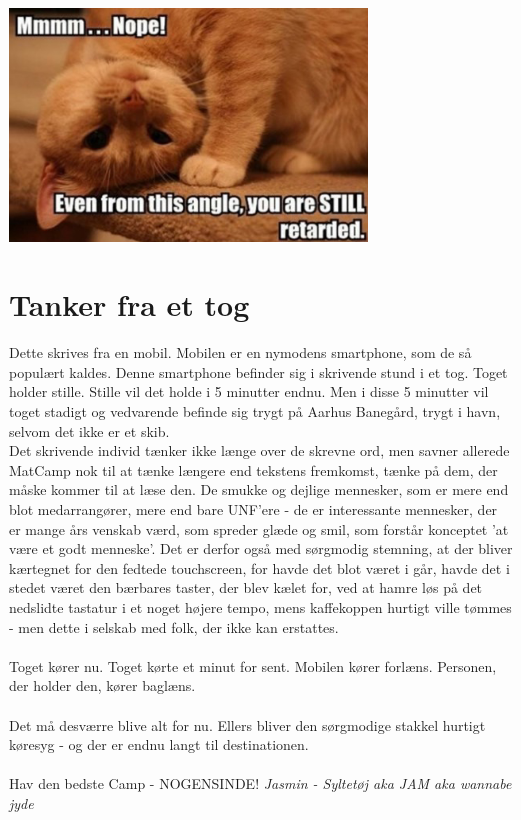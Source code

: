 \begin{minipage}[b]{0.95\linewidth}
\begin{minipage}[t]{0.47\textwidth}
\includegraphics[width=95mm]{Kat1.jpg}
\vspace{-9mm}

\section*{Tanker fra et tog}
Dette skrives fra en mobil. Mobilen er en nymodens smartphone, som de så populært kaldes. Denne smart\-phone befinder sig i skrivende stund i et tog. Toget holder stille. Stille vil det holde i 5 minutter endnu. Men i disse 5 minutter vil toget stadigt og vedvarende befinde sig trygt på Aarhus Banegård, trygt i havn, selvom det ikke er et skib.\\

Det skrivende individ tænker ikke længe over de skrevne ord, men savner allerede MatCamp nok til at tænke længere end tekstens fremkomst, tænke på dem, der måske kommer til at læse den. De smukke og dejlige mennesker, som er mere end blot medarrangører, mere end bare UNF'ere - de er interessante mennesker, der er mange års venskab værd, som spreder glæde og smil, som forstår konceptet 'at være et godt menneske'. Det er derfor også med sørgmodig stemning, at der bliver kærtegnet for den fedtede touchscreen, for havde det blot været i går, havde det i stedet været den bærbares taster, der blev kælet for, ved at hamre løs på det nedslidte tastatur i et noget højere tempo, mens kaffekoppen hurtigt ville tømmes - men dette i selskab med folk, der ikke kan erstattes. \\
\\
Toget kører nu. Toget kørte et minut for sent. Mobilen kører forlæns. Personen, der holder den, kører baglæns. \\
\\
Det må desværre blive alt for nu. Ellers bliver den sørgmodige stakkel hurtigt køresyg - og der er endnu langt til destinationen.
\\
\\
Hav den bedste Camp - NOGENSINDE!
{\flushright\emph{Jasmin - Syltetøj aka JAM aka wannabe jyde}}

\end{minipage}
\end{minipage}

